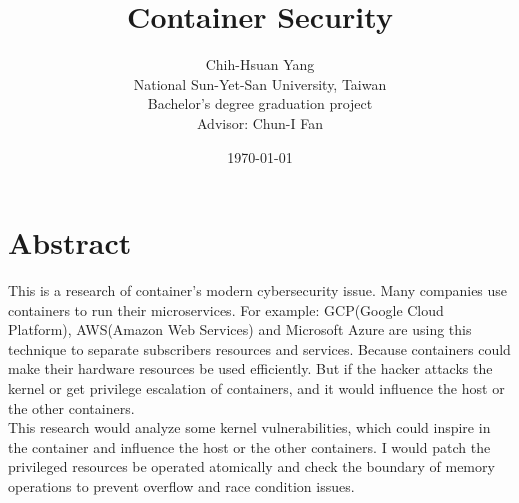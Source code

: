 \documentclass[12pt,a4paper,oneside,draft]{IEEEconf}
\title{{\mytitle Container Security}}
\author{Chih-Hsuan Yang\\

National Sun-Yet-San University, Taiwan \\
Bachelor's degree graduation project \\

Advisor: Chun-I Fan
}
\date{\today}
\begin{document}
\maketitle


\section{Abstract}
This is a research of container's modern cybersecurity issue. Many companies use containers
to run their microservices. For example: GCP(Google Cloud Platform), AWS(Amazon Web Services)
and Microsoft Azure are using this technique to separate subscribers resources and services.
Because containers could make their hardware resources be used efficiently. But if the hacker
attacks the kernel or get privilege escalation of containers, and it would influence the host or
the other containers.\\
This research would analyze some kernel vulnerabilities, which could inspire in the container
and influence the host or the other containers. I would patch the privileged resources be
operated atomically and check the boundary of memory operations to prevent overflow and race
condition issues.
\end{document}
